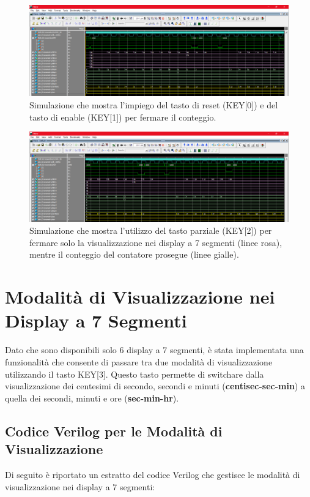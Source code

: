 \documentclass{article}
\begin{document}
\newpage

\begin{figure}[!ht]
    \centering
    \includegraphics[width=\textwidth]{Immagini/Simualzione_Finale_1.png}
    \caption{Simulazione che mostra l'impiego del tasto di reset (KEY[0]) e del tasto di enable (KEY[1]) per fermare il conteggio.}
    \label{fig:simulazione1}
\end{figure}


\begin{figure}[!ht]
    \centering
    \includegraphics[width=\textwidth]{Immagini/Simualzione_Finale_2.png}
    \caption{Simulazione che mostra l'utilizzo del tasto parziale (KEY[2]) per fermare solo la visualizzazione nei display a 7 segmenti (linee rosa), mentre il conteggio del contatore prosegue (linee gialle).}
    \label{fig:simulazione2}
\end{figure}

\newpage

\section{Modalità di Visualizzazione nei Display a 7 Segmenti}
Dato che sono disponibili solo 6 display a 7 segmenti, è stata implementata una funzionalità che consente di passare tra due modalità di visualizzazione utilizzando il tasto KEY[3]. Questo tasto permette di switchare dalla visualizzazione dei centesimi di secondo, secondi e minuti (\textbf{centisec-sec-min}) a quella dei secondi, minuti e ore (\textbf{sec-min-hr}).

\subsection{Codice Verilog per le Modalità di Visualizzazione}
Di seguito è riportato un estratto del codice Verilog che gestisce le modalità di visualizzazione nei display a 7 segmenti:
\end{document}
